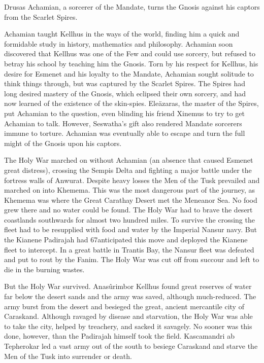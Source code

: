 \documentclass[]{book}
\begin{document}
Drusas Achamian, a sorcerer of the Mandate, turns the Gnosis against his captors from the Scarlet Spires.

Achamian taught Kellhus in the ways of the world, finding him a quick and formidable
study in history, mathematics and philosophy. Achamian soon discovered that Kellhus
was one of the Few and could use sorcery, but refused to betray his school by teaching
him the Gnosis. Torn by his respect for Kellhus, his desire for Esmenet and his loyalty
to the Mandate, Achamian sought solitude to think things through, but was captured
by the Scarlet Spires. The Spires had long desired mastery of the Gnosis, which eclipsed
their own sorcery, and had now learned of the existence of the skin-spies. Eleäzaras, the
master of the Spires, put Achamian to the question, even blinding his friend Xinemus
to try to get Achamian to talk. However, Seswatha's gift also rendered Mandate
sorcerers immune to torture. Achamian was eventually able to escape and turn the full
might of the Gnosis upon his captors.

The Holy War marched on without Achamian (an absence that caused Esmenet great
distress), crossing the Sempis Delta and fighting a major battle under the fortress walls
of Anwurat. Despite heavy losses the Men of the Tusk prevailed and marched on into
Khemema. This was the most dangerous part of the journey, as Khemema was where
the Great Carathay Desert met the Meneanor Sea. No food grew there and no water
could be found. The Holy War had to brave the desert coastlands southwards for
almost two hundred miles. To survive the crossing the fleet had to be resupplied with
food and water by the Imperial Nansur navy. But the Kianene Padirajah had
67anticipated this move and deployed the Kianene fleet to intercept. In a great battle in
Trantis Bay, the Nansur fleet was defeated and put to rout by the Fanim. The Holy War
was cut off from succour and left to die in the burning wastes.

But the Holy War survived. Anasûrimbor Kellhus found great reserves of water far
below the desert sands and the army was saved, although much-reduced. The army
burst from the desert and besieged the great, ancient mercantile city of Caraskand.
Although ravaged by disease and starvation, the Holy War was able to take the city,
helped by treachery, and sacked it savagely. No sooner was this done, however, than the
Padirajah himself took the field. Kascamandri ab Tepherokar led a vast army out of the
south to besiege Caraskand and starve the Men of the Tusk into surrender or death.
\end{document}

